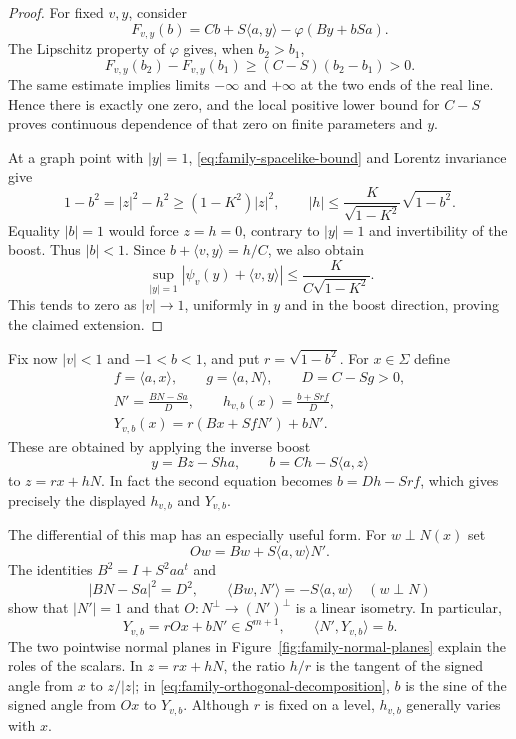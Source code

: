 \begin{proof}
For fixed $v,y$, consider
\[
 F_{v,y}(b)=Cb+S\langle a,y\rangle-\varphi(By+bSa).
\]
The Lipschitz property of $\varphi$ gives, when $b_2>b_1$,
\[
 F_{v,y}(b_2)-F_{v,y}(b_1)\ge(C-S)(b_2-b_1)>0.
\]
The same estimate implies limits $-\infty$ and $+\infty$ at the two
ends of the real line.  Hence there is exactly one zero, and the local
positive lower bound for $C-S$ proves continuous dependence of that
zero on finite parameters and $y$.

At a graph point with $|y|=1$, \eqref{eq:family-spacelike-bound} and
Lorentz invariance give
\begin{equation}\label{eq:family-graph-estimate}
 1-b^2=|z|^2-h^2\ge(1-K^2)|z|^2,
 \qquad
 |h|\le\frac{K}{\sqrt{1-K^2}}\sqrt{1-b^2}.
\end{equation}
Equality $|b|=1$ would force $z=h=0$, contrary to $|y|=1$ and
invertibility of the boost.  Thus $|b|<1$.
Since $b+\langle v,y\rangle=h/C$, we also obtain
\begin{equation}\label{eq:family-uniform-compactification}
 \sup_{|y|=1}|\psi_v(y)+\langle v,y\rangle|
 \le\frac{K}{C\sqrt{1-K^2}}.
\end{equation}
This tends to zero as $|v|\to1$, uniformly in $y$ and in the boost
direction, proving the claimed extension.
\end{proof}

Fix now $|v|<1$ and $-1<b<1$, and put $r=\sqrt{1-b^2}$.
For $x\in\Sigma$ define
\begin{equation}\label{eq:family-level-formulas}
 \begin{gathered}
 f=\langle a,x\rangle,\qquad g=\langle a,N\rangle,
 \qquad D=C-Sg>0,\\
 N'=\frac{BN-Sa}{D},\qquad
 h_{v,b}(x)=\frac{b+Srf}{D},\\
 Y_{v,b}(x)=r(Bx+SfN')+bN'.
 \end{gathered}
\end{equation}
These are obtained by applying the inverse boost
\[
 y=Bz-Sh a,\qquad b=Ch-S\langle a,z\rangle
\]
to $z=rx+hN$.  In fact the second equation becomes $b=Dh-Srf$,
which gives precisely the displayed $h_{v,b}$ and $Y_{v,b}$.

The differential of this map has an especially useful form.
For $w\perp N(x)$ set
\[
 Ow=Bw+S\langle a,w\rangle N'.
\]
The identities $B^2=I+S^2aa^t$ and
\[
 |BN-Sa|^2=D^2,\qquad
 \langle Bw,N'\rangle=-S\langle a,w\rangle
 \quad(w\perp N)
\]
show that $|N'|=1$ and that
$O:N^\perp\longrightarrow(N')^\perp$ is a linear isometry.
In particular,
\begin{equation}\label{eq:family-orthogonal-decomposition}
 Y_{v,b}=rOx+bN'\in S^{m+1},\qquad
 \langle N',Y_{v,b}\rangle=b.
\end{equation}
The two pointwise normal planes in Figure~\ref{fig:family-normal-planes}
explain the roles of the scalars.  In
$z=rx+hN$, the ratio $h/r$ is the tangent of the signed angle from
$x$ to $z/|z|$; in \eqref{eq:family-orthogonal-decomposition}, $b$ is
the sine of the signed angle from $Ox$ to $Y_{v,b}$.
Although $r$ is fixed on a level, $h_{v,b}$ generally varies with $x$.

